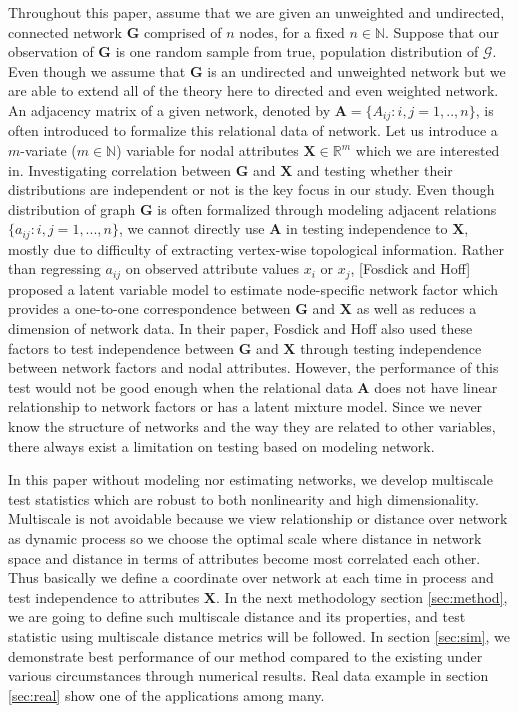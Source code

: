 \documentclass[12pt]{article}
\theoremstyle{definition}
\begin{document}
 Throughout this paper, assume that we are given an unweighted and undirected, connected network $\boldsymbol{G}$ comprised of $n$ nodes, for a fixed $n \in \mathbb{N}$. Suppose that our observation of $\boldsymbol{G}$ is one random sample from true, population distribution of $\mathcal{G}$. Even though we assume that $\boldsymbol{G}$ is an undirected and unweighted network but we are able to extend all of the theory here to directed and even weighted network. An adjacency matrix of a given network, denoted by $\boldsymbol{A} = \{A_{ij} : i,j= 1,..,n \}$, is often introduced to formalize this relational data of network. Let us introduce a $m$-variate ($m \in \mathbb{N}$) variable for nodal attributes $\boldsymbol{X}  \in \mathbb{R}^{m}$ which we are interested in. Investigating correlation between $\boldsymbol{G}$ and $\boldsymbol{X}$ and testing whether their distributions are independent or not is the key focus in our study. 
 Even though distribution of graph $\boldsymbol{G}$ is often formalized through modeling adjacent relations $\{a_{ij} : i,j = 1,... , n \}$, we cannot directly use $\mathbf{A}$ in testing independence to $\mathbf{X}$, mostly due to difficulty of extracting vertex-wise topological information. Rather than regressing $a_{ij}$ on observed attribute values $x_{i}$ or $x_{j}$, [Fosdick and Hoff] proposed a latent variable model to estimate node-specific network factor which provides a one-to-one correspondence between $\boldsymbol{G}$ and $\boldsymbol{X}$ as well as reduces a dimension of network data. In their paper, Fosdick and Hoff also used these factors to test independence between $\boldsymbol{G}$ and $\boldsymbol{X}$ through testing independence between network factors and nodal attributes. However, the performance of this test would not be good enough when the relational data $\boldsymbol{A}$ does not have linear relationship to network factors or has a latent mixture model. Since we never know the structure of networks and the way they are related to other variables, there always exist a limitation on testing based on modeling network.
 
 In this paper without modeling nor estimating networks, we develop multiscale test statistics which are robust to both nonlinearity and high dimensionality. Multiscale is not avoidable because we view relationship or distance over network as dynamic process so we choose the optimal scale where distance in network space and distance in terms of attributes become most correlated each other. Thus basically we define a coordinate over network at each time in process and test independence to attributes $\mathbf{X}$. In the next methodology section \ref{sec:method}, we are going to define such multiscale distance and its properties, and test statistic using multiscale distance metrics will be followed. In section \ref{sec:sim}, we demonstrate best performance of our method compared to the existing under various circumstances through numerical results. Real data example in section \ref{sec:real} show one of the applications among many.  
 
\end{document}
